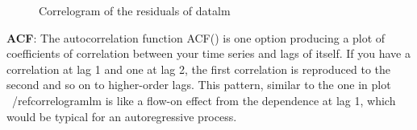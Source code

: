 \documentclass[11pt, a4paper]{article} %
\begin{document}
\begin{figure}[ht]
\begin{center}
\qquad
{}
\qquad
{}
\end{center}
\caption{Correlogram of the residuals of datalm}
\label{corr_res_lm}
\end{figure}


\noindent   \textbf{ACF}:  The autocorrelation function ACF() is one option producing a  plot of coefficients of correlation between your time series and lags of itself.   If you have a correlation at lag 1 and one at lag 2, the first correlation is reproduced to the second and so on to higher-order lags. This pattern, similar to the one in plot ~/ref{correlogramlm} is like a flow-on effect from the dependence at lag 1, which would be typical for an autoregressive process. 
	
\end{document}
